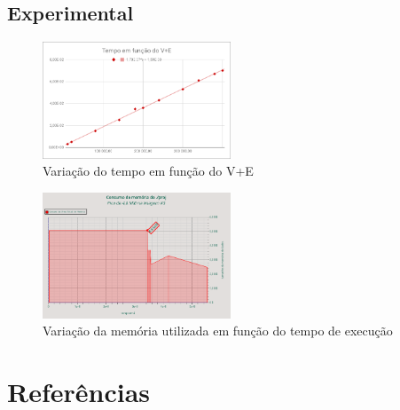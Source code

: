 \documentclass[12pt,a4paper]{article}
\begin{document}
\subsection{Experimental}

\begin{figure}[h]
			\centering
			\includegraphics[width=0.5\textwidth]{ss_t(V+E)}
			\caption{Variação do tempo em função do V+E}
\end{figure}
\begin{figure}[h]
			\centering
			\includegraphics[width=0.5\textwidth]{ss_m(tex)}
			\caption{Variação da memória utilizada em função do tempo de execução}
\end{figure}

\section{Referências}
\end{document}
